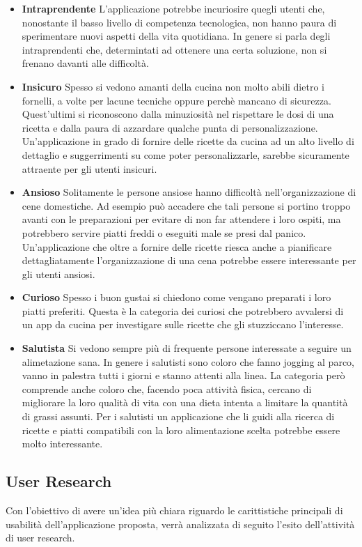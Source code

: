 \begin{itemize}
\item \textbf{Intraprendente}
L'applicazione potrebbe incuriosire quegli utenti che, nonostante il
basso livello di competenza tecnologica, non hanno paura di sperimentare
nuovi aspetti della vita quotidiana. In genere si parla degli
intraprendenti che, determintati ad ottenere una certa soluzione, non si
frenano davanti alle difficoltà.
\item \textbf{Insicuro}
Spesso si vedono amanti della cucina non molto abili dietro i fornelli,
a volte per lacune tecniche oppure perchè mancano di sicurezza.
Quest'ultimi si riconoscono dalla minuziosità nel rispettare le dosi di
una ricetta e dalla paura di azzardare qualche punta di
personalizzazione.
Un'applicazione in grado di fornire delle ricette da cucina ad un alto
livello di dettaglio e suggerrimenti su come poter personalizzarle,
sarebbe sicuramente attraente per gli utenti insicuri.
\item \textbf{Ansioso}
Solitamente le persone ansiose hanno difficoltà nell'organizzazione di
cene domestiche. Ad esempio può accadere che tali persone si portino troppo avanti
con le preparazioni per evitare di non far attendere i loro ospiti, ma
potrebbero servire piatti freddi o eseguiti male se presi dal panico.
Un'applicazione che oltre a fornire delle ricette riesca anche a
pianificare dettagliatamente l'organizzazione di una cena potrebbe essere
interessante per gli utenti ansiosi.
\item \textbf{Curioso}
Spesso i buon gustai si chiedono come vengano preparati i loro piatti
preferiti. Questa è la categoria dei curiosi che potrebbero avvalersi di
un app da cucina per investigare sulle ricette che gli stuzziccano
l'interesse.
\item \textbf{Salutista}
Si vedono sempre più di frequente persone interessate a seguire un
alimetazione sana. In genere i salutisti sono coloro che fanno jogging
al parco, vanno in palestra tutti i giorni e stanno attenti alla linea.
La categoria però comprende anche coloro che, facendo poca attività
fisica, cercano di migliorare la loro qualità di vita con una dieta intenta 
a limitare la quantità di grassi assunti.
Per i salutisti un applicazione che li guidi alla ricerca di ricette e
piatti compatibili con la loro alimentazione scelta potrebbe essere
molto interessante.

\end{itemize}


\subsection{User Research}
Con l'obiettivo di avere un'idea più chiara riguardo le carittistiche
principali di usabilità dell'applicazione proposta, verrà analizzata di
seguito l'esito dell'attività di user research.

